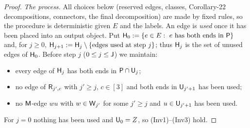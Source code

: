 \begin{proof}
\emph{The process.} All choices below (reserved edges, classes, Corollary-22 decompositions, connectors, the final
decomposition) are made by fixed rules, so the procedure is deterministic given $E$ and the labels. An edge is
\emph{used} once it has been placed into an output object. Put $\mathsf{H}_0:=\{e\in E:\ e\text{ has both ends in }\mathsf{P}\}$
and, for $j\ge0$, $\mathsf{H}_{j+1}:=\mathsf{H}_j\setminus\{\text{edges used at step }j\}$; thus $\mathsf{H}_j$ is the set of unused edges
of $\mathsf{H}_0$. Before step $j$ ($0\le j\le\mathsf{J}$) we maintain:
\begin{itemize}
\item[(Inv1)] every edge of $\mathsf{H}_j$ has both ends in $\mathsf{P}\cap\mathsf{U}_j$;
\item[(Inv2)] no edge of $\mathsf{R}_{j',c}$ with $j'\ge j$, $c\in[3]$ and both ends in $\mathsf{U}_{j'+1}$ has been used;
\item[(Inv3)] no $\mathsf{M}$-edge $wu$ with $w\in\mathsf{W}_{j'}$ for some $j'\ge j$ and $u\in\mathsf{U}_{j'+1}$ has been used.
\end{itemize}
For $j=0$ nothing has been used and $\mathsf{U}_0=Z$, so (Inv1)--(Inv3) hold.


\end{proof}
